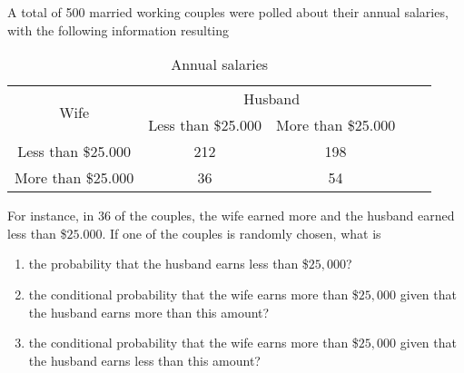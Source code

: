 \documentclass{article}[12pt]
\newenvironment{problem}[1]
  {\renewcommand\theinnercustomprblm{#1}\innercustomprblm}
  {\endinnercustomprblm}
\begin{document}
\begin{problem}{3.21}\normalfont
A total of 500 married working couples were polled about their annual salaries, with the following information resulting
\begin{table}[ph]
  \centering
  \begin{tabular}{c|c|c|c|c}
    \hline
    \multirow{2}{*}{Wife} & \multicolumn{2}{c}{Husband} \\
    \hhline{~--}
    & Less than \$25.000 & More than \$25.000 \\
    \hline
    Less than \$25.000 & 212 & 198 \\
    \hline
    More than \$25.000 & 36 & 54 \\
    \hline
  \end{tabular}
  \caption{Annual salaries}
\end{table}
For instance, in $36$ of the couples, the wife earned more and the husband earned less than \$$25.000$.
If one of the couples is randomly chosen, what is
\begin{enumerate}[label=(\alph*)]
    \item the probability that the husband earns less than \$$25,000$?
    \item the conditional probability that the wife earns more than \$$25,000$ given that the husband earns more than this amount?
    \item the conditional probability that the wife earns more than \$$25,000$ given that the husband earns less than this amount?
\end{enumerate}
\end{problem}
\end{document}
